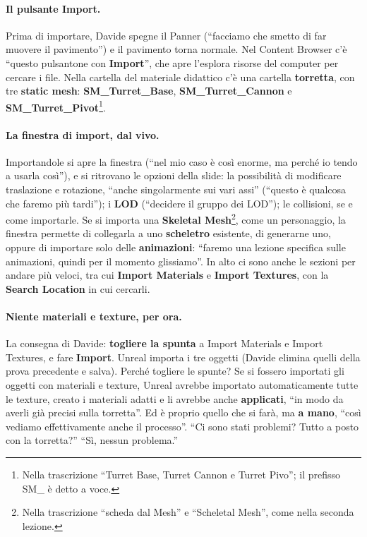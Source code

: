 \paragraph{Il pulsante Import.} Prima di importare, Davide spegne il Panner (``facciamo
che smetto di far muovere il pavimento'') e il pavimento torna normale. Nel Content
Browser c'è ``questo pulsantone con \textbf{Import}'', che apre l'esplora risorse del
computer per cercare i file. Nella cartella del materiale didattico c'è una cartella
\textbf{torretta}, con tre \textbf{static mesh}: \textbf{SM\_Turret\_Base},
\textbf{SM\_Turret\_Cannon} e \textbf{SM\_Turret\_Pivot}\footnote{Nella trascrizione
``Turret Base, Turret Cannon e Turret Pivo''; il prefisso SM\_ è detto a voce.}.

\paragraph{La finestra di import, dal vivo.} Importandole si apre la finestra (``nel
mio caso è così enorme, ma perché io tendo a usarla così''), e si ritrovano le opzioni
della slide: la possibilità di modificare traslazione e rotazione, ``anche
singolarmente sui vari assi'' (``questo è qualcosa che faremo più tardi''); i
\textbf{LOD} (``decidere il gruppo dei LOD''); le collisioni, se e come importarle. Se si
importa una \textbf{Skeletal Mesh}\footnote{Nella trascrizione ``scheda dal Mesh'' e
``Scheletal Mesh'', come nella seconda lezione.}, come un personaggio, la finestra
permette di collegarla a uno \textbf{scheletro} esistente, di generarne uno, oppure di
importare solo delle \textbf{animazioni}: ``faremo una lezione specifica sulle
animazioni, quindi per il momento glissiamo''. In alto ci sono anche le sezioni per
andare più veloci, tra cui \textbf{Import Materials} e \textbf{Import Textures}, con la
\textbf{Search Location} in cui cercarli.

\paragraph{Niente materiali e texture, per ora.} La consegna di Davide: \textbf{togliere
la spunta} a Import Materials e Import Textures, e fare \textbf{Import}. Unreal importa i
tre oggetti (Davide elimina quelli della prova precedente e salva). Perché togliere le
spunte? Se si fossero importati gli oggetti con materiali e texture, Unreal avrebbe
importato automaticamente tutte le texture, creato i materiali adatti e li avrebbe
anche \textbf{applicati}, ``in modo da averli già precisi sulla torretta''. Ed è
proprio quello che si farà, ma \textbf{a mano}, ``così vediamo effettivamente anche il
processo''. ``Ci sono stati problemi? Tutto a posto con la torretta?'' ``Sì, nessun
problema.''

